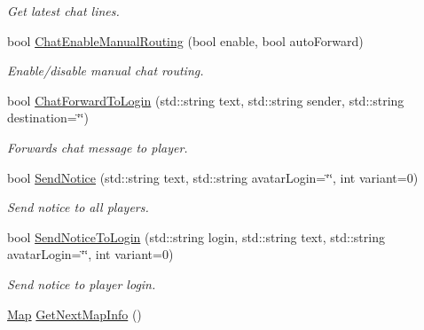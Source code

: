 \begin{DoxyCompactItemize}
\begin{DoxyCompactList}\small\item\em Get latest chat lines. \end{DoxyCompactList}\item 
bool \hyperlink{classMethods_aa6aed7b14ccfce003243e7d21fec70b4}{Chat\-Enable\-Manual\-Routing} (bool enable, bool auto\-Forward)
\begin{DoxyCompactList}\small\item\em Enable/disable manual chat routing. \end{DoxyCompactList}\item 
bool \hyperlink{classMethods_ab0a918ef2ae8ba45fa350f023d7174ab}{Chat\-Forward\-To\-Login} (std\-::string text, std\-::string sender, std\-::string destination=\char`\"{}\char`\"{})
\begin{DoxyCompactList}\small\item\em Forwards chat message to player. \end{DoxyCompactList}\item 
bool \hyperlink{classMethods_add538878f839a6a5078fec808e1f064f}{Send\-Notice} (std\-::string text, std\-::string avatar\-Login=\char`\"{}\char`\"{}, int variant=0)
\begin{DoxyCompactList}\small\item\em Send notice to all players. \end{DoxyCompactList}\item 
bool \hyperlink{classMethods_a7229aacea5b60d1d502c5df39f10a50c}{Send\-Notice\-To\-Login} (std\-::string login, std\-::string text, std\-::string avatar\-Login=\char`\"{}\char`\"{}, int variant=0)
\begin{DoxyCompactList}\small\item\em Send notice to player login. \end{DoxyCompactList}\item 
\hypertarget{classMethods_afa0e3e406c14aad10521d4d6c6333a70}{\hyperlink{structMap}{Map} \hyperlink{classMethods_afa0e3e406c14aad10521d4d6c6333a70}{Get\-Next\-Map\-Info} ()}\label{classMethods_afa0e3e406c14aad10521d4d6c6333a70}


\end{DoxyCompactItemize}
